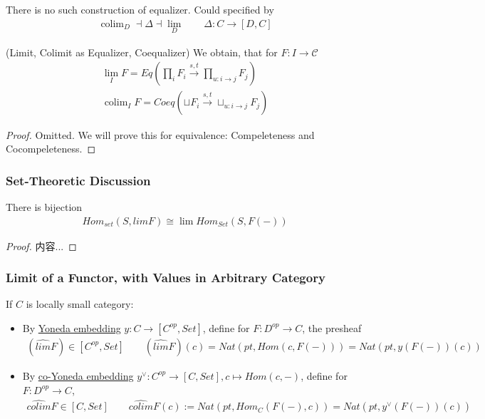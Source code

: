 \documentclass[Total.tex]{subfiles}
\begin{document}
				There is no such construction of equalizer. Could specified by
				\begin{gather*}
					\operatorname{colim}_D\dashv \Delta\dashv \lim_D\qquad \Delta:C\rightarrow [D,C]
				\end{gather*}
				
				\begin{proposition}
					(Limit, Colimit as Equalizer, Coequalizer) We obtain, that for $F:I\rightarrow \mathcal{C}$
					\begin{gather*}
						\lim_I F=Eq(\prod_{i} F_i\stackrel{s,t}{\rightarrow} \prod_{u:i\rightarrow j} F_j)\\
						\operatorname{colim}_I F=Coeq(\sqcup F_i\stackrel{s,t}{\rightarrow} \sqcup_{u:i\rightarrow j} F_j)
					\end{gather*}
				\end{proposition}
				\begin{proof}
					Omitted. We will prove this for equivalence: Compeleteness and Cocompeleteness. 
				\end{proof}
				
				\subsubsection{Set-Theoretic Discussion}
				
				\begin{proposition}
					There is bijection
					\begin{gather*}
						Hom_{set}(S,limF)\cong \lim Hom_{Set}(S,F(-))
					\end{gather*}
				\end{proposition}
				\begin{proof}
					内容...
				\end{proof}
				\subsubsection{Limit of a Functor, with Values in Arbitrary Category}
					\begin{Def} If $C$ is locally small category:
						\begin{itemize}
							\item By \underline{Yoneda embedding} $y:C\rightarrow [C^{op},Set]$, define for $F:D^{op}\rightarrow C$, the presheaf
							\begin{gather*}
								(\hat{lim} F)\in [C^{op},Set]\qquad (\hat{lim} F)(c)=Nat(pt,Hom(c,F(-)))=Nat(pt, y(F(-))(c))
							\end{gather*}
							
							\item By \underline{co-Yoneda embedding} $y^\vee:C^{op}\rightarrow [C,Set],c\mapsto Hom(c,-)$, define for $F:D^{op}\rightarrow C$,
							\begin{gather*}
								\hat{colim}F\in [C,Set]\qquad \hat{colim}F(c):=Nat(pt,Hom_C(F(-),c))=Nat(pt,y^\vee(F(-))(c))
							\end{gather*}
						\end{itemize}
					\end{Def}
					
\end{document}

